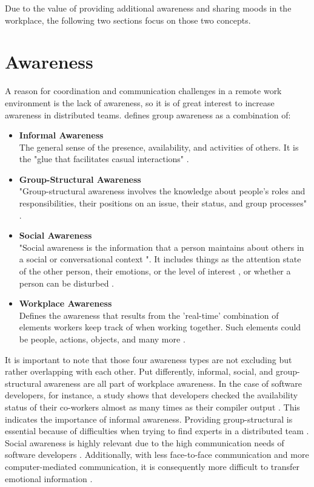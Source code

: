 Due to the value of providing additional awareness and sharing moods in the workplace, the following two sections focus on those two concepts.

\section{Awareness}
A reason for coordination and communication challenges in a remote work environment is the lack of awareness, so it is of great interest to increase awareness in distributed teams. \textcite{gutwin1996workspace} defines group awareness as a combination of:

\begin{itemize}[itemsep=0ex, parsep=0ex, leftmargin=*]
      \item \textbf{Informal Awareness} \\
            The general sense of the presence, availability, and activities of others. It is the "glue that facilitates casual interactions" \autocite{gutwin1996workspace}.
      \item \textbf{Group-Structural Awareness} \\
            "Group-structural awareness involves the knowledge about people's roles and responsibilities, their positions on an issue, their status, and group processes" \autocite{gutwin1996workspace}.
      \item \textbf{Social Awareness} \\
            "Social awareness is the information that a person maintains about others in a social or conversational context "\autocite{gutwin1996workspace}. It includes things as the attention state of the other person, their emotions, or the level of interest \autocite{gutwin1996workspace}, or whether a person can be disturbed \autocite{gutwin1995support}.
      \item \textbf{Workplace Awareness} \\
            Defines the awareness that results from the 'real-time' combination of elements workers keep track of when working together. Such elements could be people, actions, objects, and many more \autocite{gutwin1995support}.
\end{itemize}

It is important to note that those four awareness types are not excluding but rather overlapping with each other. Put differently, informal, social, and group-structural awareness are all part of workplace awareness. In the case of software developers, for instance, a study shows that developers checked the availability status of their co-workers almost as many times as their compiler output \autocite{ko2007information}. This indicates the importance of informal awareness. Providing group-structural is essential because of difficulties when trying to find experts in a distributed team \autocite{herbsleb2003empirical}. Social awareness is highly relevant due to the high communication needs of software developers \autocite{perry1994people}. Additionally, with less face-to-face communication and more computer-mediated communication, it is consequently more difficult to transfer emotional information \autocite{rivera1996effects}.

